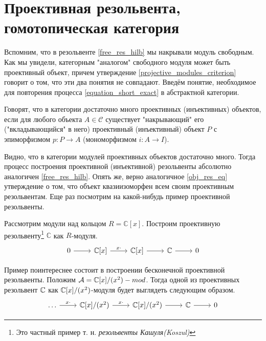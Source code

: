 \documentclass[../main.tex]{subfiles}
\begin{document}
\section{Проективная резольвента, гомотопическая категория}
Вспомним, что в резольвенте \eqref{free_res_hilb} мы накрывали модуль свободным. Как мы увидели, категорным "аналогом" свободного модуля может быть проективный объект, причем утверждение \ref{projective_modules_criterion} говорит о том, что эти два понятия не совпадают. Введём понятие, необходимое для повторения процесса \eqref{equation_short_exact} в абстрактной категории.
\begin{to_def}
Говорят, что в категории достаточно много проективных (инъективных) объектов, если для любого объекта $A\in \mathcal{C}$ существует "накрывающий" его ("вкладывающийся" в него) проективный (инъективный) объект $P$ с эпиморфизмом $p:P \to A$ (мономорфизмом $i:A\to I$).
\end{to_def}
Видно, что в категории модулей проективных объектов достаточно много. Тогда процесс построения проективной (инъективной) резольвенты абсолютно аналогичен \eqref{free_res_hilb}. Опять же, верно аналогичное \ref{obj_res_eq} утверждение о том, что объект квазиизоморфен всем своим проективным резольвентам. Еще раз посмотрим на какой-нибудь пример проективной резольвенты.
\begin{to_ex}
Рассмотрим модули над кольцом $R=\mathbb{C}[x]$. Построим проективную резольвенту\footnote{Это частный пример т. н. \emph{резольвенты Кашуля(Koszul)}} $\mathbb{C}$ как $R$-модуля.
\begin{equation*}
    \begin{tikzcd}
	0 & {\mathbb{C}[x]} & {\mathbb{C}[x]} & \mathbb{C} & 0
	\arrow[from=1-1, to=1-2]
	\arrow["x\cdot", from=1-2, to=1-3]
	\arrow[from=1-3, to=1-4]
	\arrow[from=1-4, to=1-5]
\end{tikzcd}
\end{equation*}
\end{to_ex}
\begin{to_ex}
Пример поинтереснее состоит в построении бесконечной проективной резольвенты. Положим $\mathcal{A} = \mathbb{C}[x]/(x^2)-mod$. Тогда одной из проективных резольвент $\mathbb{C}$ как $\mathbb{C}[x]/(x^2)$-модуля будет выглядеть следующим образом.
\begin{equation*}
    \begin{tikzcd}
	\ldots & {\C[x]/(x^2)} & {\C[x]/(x^2)} & \C & 0
	\arrow["x\cdot", from=1-1, to=1-2]
	\arrow["x\cdot", from=1-2, to=1-3]
	\arrow[from=1-3, to=1-4]
	\arrow[from=1-4, to=1-5]
\end{tikzcd}
\end{equation*}
\end{to_ex}
\end{document}
